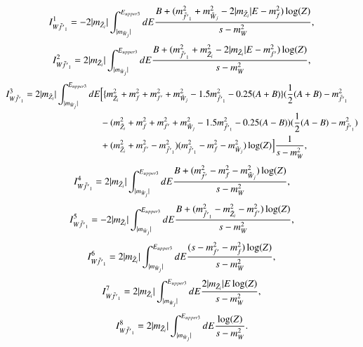 \documentclass[final,3p,times]{elsarticle}
\begin{document}
\begin{equation}
I_{W \tilde{f'}_1}^{1} = -2|m_{\tilde{Z}_i}| \int_{|m_{\tilde{W}_j}|}^{E_{upper3}} dE {B + (m_{\tilde{f'}_1}^2 + m_{\tilde{W}_j}^2 - 2|m_{\tilde{Z}_i}|E - m_{f}^2)\log(Z) \over s-m_{W}^2} ,
\end{equation}
\begin{equation}
I_{W \tilde{f'}_1}^{2} = 2|m_{\tilde{Z}_i}| \int_{|m_{\tilde{W}_j}|}^{E_{upper3}} dE {B + (m_{\tilde{f'}_1}^2 + m_{\tilde{Z}_i}^2 - 2|m_{\tilde{Z}_i}|E - m_{f'}^2)\log(Z) \over s - m_{W}^2},
\end{equation}
\begin{equation}
\begin{aligned}
I_{W \tilde{f'}_1}^{3} = 2|m_{\tilde{Z}_i}| \int_{|m_{\tilde{W}_j}|}^{E_{upper3}} dE & \Big[\{m_{\tilde{Z}_i}^2 + m_{f}^2 + m_{f'}^2 + m_{\tilde{W}_j}^2 - 1.5 m_{\tilde{f'}_1}^2 - 0.25(A+B)\}(\frac{1}{2}(A+B) - m_{\tilde{f'}_1}^2 \\ & - (m_{\tilde{Z}_i}^2 + m_{f}^2 + m_{f'}^2 +m_{\tilde{W}_j}^2 - 1.5m_{\tilde{f'}_1}^2 - 0.25(A-B))(\frac{1}{2}(A-B) - m_{\tilde{f'}_1}^2) \\ & + (m_{\tilde{Z}_i}^2 + m_{f'}^2 - m_{\tilde{f'}_1}^2)(m_{\tilde{f'}_1}^2-m_{f}^2 - m_{\tilde{W}_j}^2)\log(Z)\Big]{1 \over s - m_{W}^2},
\end{aligned}
\end{equation}
\begin{equation}
I_{W \tilde{f'}_1}^{4} = 2|m_{\tilde{Z}_i}| \int_{|m_{\tilde{W}_j}|}^{E_{upper3}} dE {B + (m_{\tilde{f'}}^2 - m_{f}^2 - m_{\tilde{W}_j}^2)\log(Z) \over s - m_{W}^2},
\end{equation}
\begin{equation}
I_{W \tilde{f'}_1}^{5} = -2|m_{\tilde{Z}_i}| \int_{|m_{\tilde{W}_j}|}^{E_{upper3}} dE {B + (m_{\tilde{f'}_1}^2 - m_{\tilde{Z}_i}^2 - m_{f'}^2)\log(Z) \over s - m_{W}^2},
\end{equation}
\begin{equation}
I_{W \tilde{f'}_1}^{6} = 2|m_{\tilde{Z}_i}| \int_{|m_{\tilde{W}_j}|}^{E_{upper3}} dE {(s-m_{f'}^2 - m_{f}^2)\log(Z) \over s- m_{W}^2},
\end{equation}
\begin{equation}
I_{W \tilde{f'}_1}^{7} = 2|m_{\tilde{Z}_i}| \int_{|m_{\tilde{W}_j}|}^{E_{upper3}} dE {2|m_{\tilde{Z}_i}|E \log(Z) \over s-m_{W}^2},
\end{equation}
\begin{equation}
I_{W \tilde{f'}_1}^{8} = 2|m_{\tilde{Z}_i}| \int_{|m_{\tilde{W}_j}|}^{E_{upper3}} dE {\log(Z) \over s-m_{W}^2}.
\end{equation}
\end{document}
